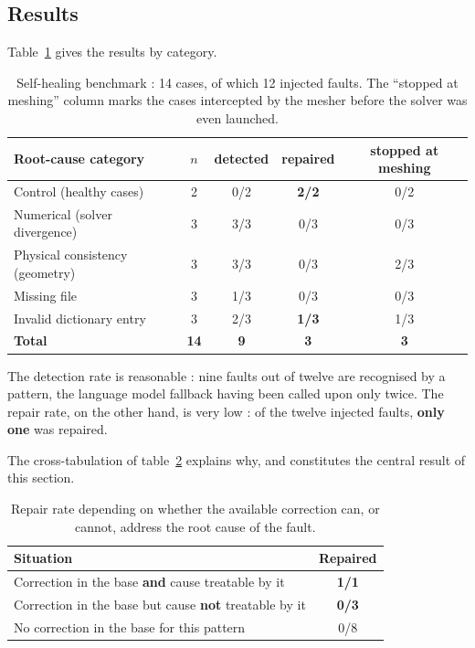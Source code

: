 \subsection{Results}

Table~\ref{tab:selfheal} gives the results by category.

\begin{table}[htbp]
\centering
\caption[Self-healing benchmark]{Self-healing benchmark : 14 cases, of which 12
injected faults. The ``stopped at meshing'' column marks the cases intercepted
by the mesher before the solver was even launched.}
\label{tab:selfheal}
\begin{tabularx}{\textwidth}{@{}Xcccc@{}}
\toprule
\textbf{Root-cause category} & \textbf{$n$} & \textbf{detected} &
\textbf{repaired} & \textbf{stopped at meshing}\\
\midrule
Control (healthy cases) & 2 & 0/2 & \textbf{2/2} & 0/2\\
Numerical (solver divergence) & 3 & 3/3 & 0/3 & 0/3\\
Physical consistency (geometry) & 3 & 3/3 & 0/3 & 2/3\\
Missing file & 3 & 1/3 & 0/3 & 0/3\\
Invalid dictionary entry & 3 & 2/3 & \textbf{1/3} & 1/3\\
\midrule
\textbf{Total} & \textbf{14} & \textbf{9} & \textbf{3} & \textbf{3}\\
\bottomrule
\end{tabularx}
\end{table}

The detection rate is reasonable : nine faults out of twelve are recognised by a
pattern, the language model fallback having been called upon only twice. The
repair rate, on the other hand, is very low : of the twelve injected faults,
\textbf{only one} was repaired.

The cross-tabulation of table~\ref{tab:selfheal-croise} explains why, and
constitutes the central result of this section.

\begin{table}[htbp]
\centering
\caption[Repair versus treatability of the cause]{Repair rate depending on
whether the available correction can, or cannot, address the root cause of the
fault.}
\label{tab:selfheal-croise}
\begin{tabularx}{0.9\textwidth}{@{}Xc@{}}
\toprule
\textbf{Situation} & \textbf{Repaired}\\
\midrule
Correction in the base \textbf{and} cause treatable by it & \textbf{1/1}\\
Correction in the base but cause \textbf{not} treatable by it &
  \textcolor{cAlert}{\textbf{0/3}}\\
No correction in the base for this pattern & 0/8\\
\bottomrule
\end{tabularx}
\end{table}

